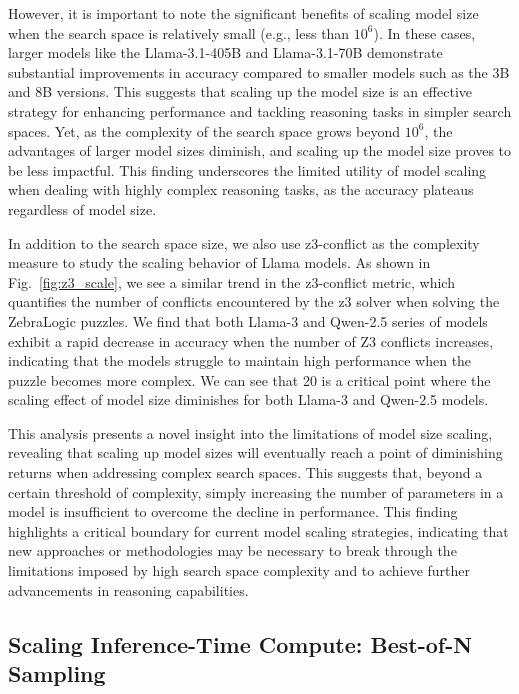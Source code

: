 However, it is important to note the significant benefits of scaling model size when the search space is relatively small (e.g., less than \(10^6\)). In these cases, larger models like the Llama-3.1-405B and Llama-3.1-70B demonstrate substantial improvements in accuracy compared to smaller models such as the 3B and 8B versions. This suggests that scaling up the model size is an effective strategy for enhancing performance and tackling reasoning tasks in simpler search spaces. Yet, as the complexity of the search space grows beyond \(10^6\), the advantages of larger model sizes diminish, and scaling up the model size proves to be less impactful. This finding underscores the limited utility of model scaling when dealing with highly complex reasoning tasks, as the accuracy plateaus regardless of model size.

In addition to the search space size, we also use z3-conflict as the complexity measure to study the scaling behavior of Llama models. As shown in Fig.~\ref{fig:z3_scale}, we see a similar trend in the z3-conflict metric, which quantifies the number of conflicts encountered by the z3 solver when solving the ZebraLogic puzzles. We find that both Llama-3 and Qwen-2.5 series of models exhibit a rapid decrease in accuracy when the number of Z3 conflicts increases, indicating that the models struggle to maintain high performance when the puzzle becomes more complex. We can see that 20 is a critical point where the scaling effect of model size diminishes for both Llama-3 and Qwen-2.5 models.



This analysis presents a novel insight into the limitations of model size scaling, revealing that scaling up model sizes will eventually reach a point of diminishing returns when addressing complex search spaces. This suggests that, beyond a certain threshold of complexity, simply increasing the number of parameters in a model is insufficient to overcome the decline in performance. This finding highlights a critical boundary for current model scaling strategies, indicating that new approaches or methodologies may be necessary to break through the limitations imposed by high search space complexity and to achieve further advancements in reasoning capabilities.


\subsection{Scaling Inference-Time Compute: Best-of-N Sampling}



